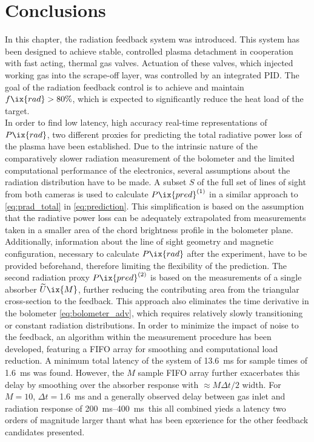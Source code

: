     \section{Conclusions}\label{sec:conclusionschap2}%
%
        In this chapter, the radiation feedback system was introduced. This system has been designed to achieve stable, controlled plasma detachment in cooperation with fast acting, thermal gas valves. Actuation of these valves, which injected working gas into the scrape-off layer, was controlled by an integrated PID. The goal of the radiation feedback control is to achieve and maintain $f\ix{rad}>80\%$, which is expected to significantly reduce the heat load of the target.\\%
        In order to find low latency, high accuracy real-time representations of $P\ix{rad}$, two different proxies for predicting the total radiative power loss of the plasma have been established. Due to the intrinsic nature of the comparatively slower radiation measurement of the bolometer and the limited computational performance of the electronics, several assumptions about the radiation distribution have to be made. A subset $S$ of the full set of lines of sight from both cameras is used to calculate $P\ix{pred}^{\left(1\right)}$ in a similar approach to \cref{eq:prad_total} in \cref{eq:prediction}. This simplification is based on the assumption that the radiative power loss can be adequately extrapolated from measurements taken in a smaller area of the chord brightness profile in the bolometer plane. Additionally, information about the line of sight geometry and magnetic configuration, necessary to calculate $P\ix{rad}$ after the experiment, have to be provided beforehand, therefore limiting the flexibility of the prediction. The second radiation proxy $P\ix{pred}^{\left(2\right)}$ is based on the measurements of a single absorber $\widetilde{U}\ix{M}$, further reducing the contributing area from the triangular cross-section to the feedback. This approach also eliminates the time derivative in the bolometer \cref{eq:bolometer_adv}, which requires relatively slowly transitioning or constant radiation distributions. In order to minimize the impact of noise to the feedback, an algorithm within the measurement procedure has been developed, featuring a FIFO array for smoothing and computational load reduction. A minimum total latency of the system of \SI{13.6}{\milli\second} for sample times of \SI{1.6}{\milli\second} was found. However, the $M$ sample FIFO array further exacerbates this delay by smoothing over the absorber response with $\approx M\Delta t/2$ width. For $M=10$, $\Delta t=$\SI{1.6}{\milli\second} and a generally observed delay between gas inlet and radiation response of \SIrange{200}{400}{\milli\second}\, this all combined yieds a latency two orders of magnitude larger thant what has been epxerience for the other feedback candidates presented.\\%
